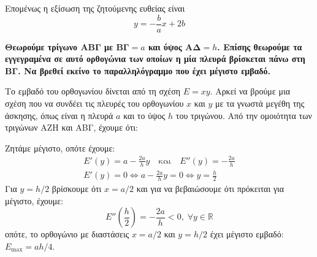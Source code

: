 \begin{solution}
\begin{myitemize}
      Επομένως η εξίσωση της ζητούμενης ευθείας είναι
      \[
        \boxed{y=-\frac{b}{a}x +2b}	
      \]
  \end{myitemize}
\end{solution}

\begin{exercise}
  {\bfseries \boldmath Θεωρούμε τρίγωνο ΑΒΓ με  ΒΓ$=a $ και ύψος ΑΔ$=h$. Επίσης 
    θεωρούμε τα εγγεγραμένα σε αυτό ορθογώνια των οποίων η μία πλευρά βρίσκεται πάνω στη
  ΒΓ. Να βρεθεί εκείνο το παραλληλόγραμμο που έχει μέγιστο εμβαδό.}
\end{exercise}
\begin{solution}
  Το εμβαδό του ορθογωνίου δίνεται από τη σχέση $ E=xy $. Αρκεί να βρούμε μια σχέση που 
  να συνδέει τις πλευρές του ορθογωνίου $x$ και $y$ με τα γνωστά μεγέθη της άσκησης, 
  όπως είναι η πλευρά $a$ και το ύψος $h$ του τριγώνου. 
  Από την ομοιότητα των τριγώνων ΑΖΗ και ΑΒΓ, έχουμε ότι:


Ζητάμε μέγιστο, οπότε έχουμε:
\begin{gather*}
  E'(y) = a - \frac{2a}{h} y \quad \text{και} \quad E''(y) = - \frac{2a}{h} \\
  E'(y)=0 \Leftrightarrow a - \frac{2a}{h} y = 0 \Leftrightarrow y= \frac{h}{2}
\end{gather*}
Για $ y=h/2 $ βρίσκουμε ότι $ x=a/2 $ και για να βεβαιώσουμε ότι πρόκειται για 
μέγιστο, έχουμε:
\[
  E''\left(\frac{h}{2}\right) = - \frac{2a}{h} < 0, \; \forall y \in \mathbb{R}
\] 
οπότε, το ορθογώνιο με διαστάσεις $ x=a/2 $ και $ y=h/2 $ έχει μέγιστο εμβαδό: 
$ E_{\max} = {ah}/{4}  $.
\end{solution}
